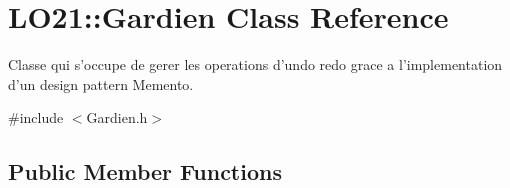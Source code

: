 \hypertarget{class_l_o21_1_1_gardien}{\section{\-L\-O21\-:\-:\-Gardien \-Class \-Reference}
\label{class_l_o21_1_1_gardien}
}


\-Classe qui s'occupe de gerer les operations d'undo redo grace a l'implementation d'un design pattern \-Memento.  




{\ttfamily \#include $<$\-Gardien.\-h$>$}

\subsection*{\-Public \-Member \-Functions}
